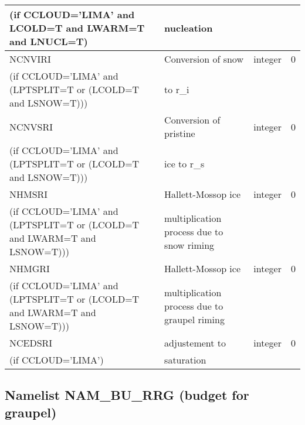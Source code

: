 \begin{longtable} {|p{}|p{}|>{\centering}p{}|p{}<{\centering}|}
(if CCLOUD='LIMA' and LCOLD=T and LWARM=T and LNUCL=T)   & nucleation   &       &   \\\hline
NCNVIRI & Conversion of snow     & integer  &  0 \index{NCNVIRI!\innam{NAM\_BU\_RRI}}\\ \nopagebreak
(if CCLOUD='LIMA' and (LPTSPLIT=T or (LCOLD=T and LSNOW=T))) &to r\_i &   &  \\\hline
NCNVSRI &  Conversion of pristine    & integer  &  0 \index{NCNVSRI!\innam{NAM\_BU\_RRI}}\\ \nopagebreak
(if CCLOUD='LIMA' and (LPTSPLIT=T or (LCOLD=T and LSNOW=T))) &ice to r\_s &   &  \\\hline
NHMSRI &Hallett-Mossop ice & integer  &  0 \index{NHMSRI!\innam{NAM\_BU\_RRI}}\\ \nopagebreak
(if CCLOUD='LIMA' and (LPTSPLIT=T or (LCOLD=T and LWARM=T and LSNOW=T))) &multiplication process due to snow riming &   &  \\\hline
NHMGRI &  Hallett-Mossop ice & integer  &  0 \index{NHMGRI!\innam{NAM\_BU\_RRI}}\\ \nopagebreak
(if CCLOUD='LIMA' and (LPTSPLIT=T or (LCOLD=T and LWARM=T and LSNOW=T))) &multiplication process due to graupel riming &   &  \\\hline
NCEDSRI & adjustement to   & integer  &  0 \index{NCEDSRI!\innam{NAM\_BU\_RRI}}\\ \nopagebreak
(if CCLOUD='LIMA') & saturation &   &  \\\hline
\end{longtable}

\subsection{Namelist NAM\_BU\_RRG (budget for graupel)}

